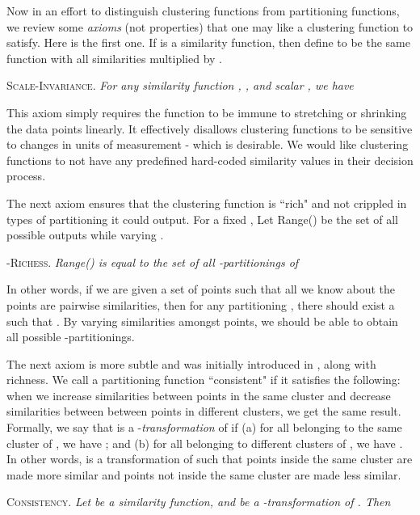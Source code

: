 \documentclass[twoside,11pt]{article}
\begin{document}
Now in an effort to distinguish clustering functions from partitioning functions, we review some \textit{axioms} (not properties) that one may like a clustering function to satisfy. Here is the first one. If  is a similarity function, then define  to be the same function with all similarities multiplied by .
\begin{center}
\textsc{Scale-Invariance.} \textit{For any similarity function , , and scalar , we have }
\end{center}

This axiom simply requires the function to be immune to stretching or shrinking the data points linearly. It effectively disallows clustering functions to be sensitive to changes in units of measurement - which is desirable. We would like clustering functions to not have any predefined hard-coded similarity values in their decision process.

The next axiom ensures that the clustering function is ``rich" and not crippled in types of partitioning it could output. For a fixed , Let Range() be the set of all possible outputs while varying .
\begin{center}
\textsc{-Richess.} \textit{Range() is equal to the set of all -partitionings of }
\end{center}

In other words, if we are given a set of points such that all we know about the points are pairwise similarities, then for any partitioning , there should exist a  such that . By varying similarities amongst points, we should be able to obtain all possible -partitionings.

The next axiom is more subtle and was initially introduced in \cite{klein1}, along with richness. We call a partitioning function ``consistent" if it satisfies the following: when we increase similarities between points in the same cluster and decrease similarities between between points in different clusters, we get the same result. Formally, we say that  is a -\textit{transformation} of  if (a) for all  belonging to the same cluster of , we have ; and (b) for all  belonging to different clusters of , we have . In other words,  is a transformation of  such that points inside the same cluster are made more similar and points not inside the same cluster are made less similar.
\begin{center}
\textsc{Consistency.} \textit{Let  be a similarity function, and  be a -transformation of . Then }
\end{center}
\end{document}
